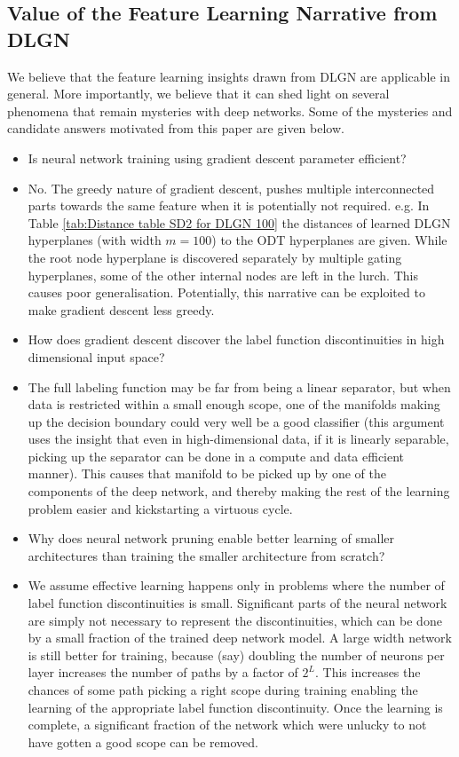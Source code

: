 \documentclass{article} %
\renewcommand{\>}{{\rightarrow}}
\renewcommand{\=}{\stackrel{\triangle}{=}}
\newcommand{\0}{{\mathbf 0}}
\begin{document}
\subsection{Value of the Feature Learning Narrative from DLGN}
We believe that the feature learning insights drawn from DLGN are applicable in general. More importantly, we believe that it can shed light on several phenomena that remain mysteries with deep networks. Some of the mysteries and  candidate answers motivated from this paper are given below.
\begin{itemize}
    \item[Q:] Is neural network training using gradient descent parameter efficient? 
    \item[A:] No. The greedy nature of gradient descent, pushes multiple interconnected parts towards the same feature when it is potentially not required. e.g. In Table \ref{tab:Distance table SD2 for DLGN 100} the distances of learned DLGN hyperplanes (with width $m=100$) to the ODT hyperplanes are given. While the root node hyperplane is discovered separately by multiple gating hyperplanes, some of the other internal nodes are  left in the lurch. This causes poor generalisation. Potentially, this narrative can be exploited to make gradient descent less greedy.

    \item[Q:] How does gradient descent discover the label function discontinuities in high dimensional input space?
    \item[A:] The full labeling function may be far from being a linear separator, but when data is restricted within a small enough scope, one of the manifolds making up the decision boundary could very well be a good classifier (this argument uses the insight that even in high-dimensional data, if it is linearly separable, picking up the separator can be done in a compute and data efficient manner).  This causes that manifold to be picked up by one of the components of the deep network, and thereby making the rest of the learning problem easier and kickstarting a virtuous cycle.
    
    \item[Q:] Why does neural network pruning enable better learning of smaller architectures than training the smaller architecture from scratch?
    \item[A:] We assume effective learning happens only in problems where the number of label function discontinuities is small. Significant parts of the neural network are simply not necessary to represent the discontinuities, which can be done by a small fraction of the trained deep network model. A large width network is still better for training, because (say) doubling the number of neurons per layer increases the number of paths by a factor of $2^L$. This increases the chances of some path picking a right scope during training enabling the learning of the appropriate label function discontinuity.  Once the learning is complete, a significant fraction of the network which were unlucky to not have gotten a good scope can be removed.


\end{itemize}
\end{document}
